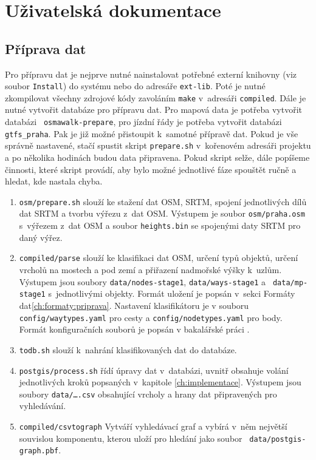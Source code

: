\chapter{Uživatelská dokumentace}
\section{Příprava dat}
Pro přípravu dat je nejprve nutné nainstalovat potřebné externí knihovny (viz
soubor {\tt Install}) do
systému nebo do adresáře {\tt ext-lib}. Poté je nutné zkompilovat všechny zdrojové
kódy zavoláním {\tt make} v~adresáři {\tt compiled}. Dále je nutné vytvořit databáze
pro přípravu dat. Pro mapová data je potřeba vytvořit databázi {\tt
osmawalk-prepare},
pro jízdní řády je potřeba vytvořit databázi {\tt gtfs\_praha}. Pak je již možné
přistoupit k~samotné přípravě dat. Pokud je vše správně nastavené, stačí spustit
skript {\tt prepare.sh} v~kořenovém adresáři projektu a po několika hodinách
budou data připravena. Pokud skript selže, dále popíšeme činnosti, které skript
provádí, aby bylo možné jednotlivé fáze spouštět ručně a hledat, kde nastala chyba.

\begin{enumerate}
\item {\tt osm/prepare.sh} slouží ke stažení dat OSM, SRTM, spojení jednotlivých
dílů dat SRTM a tvorbu výřezu z~dat OSM. Výstupem je soubor {\tt osm/praha.osm}
s~výřezem z~dat OSM a soubor {\tt heights.bin} se spojenými daty SRTM pro daný
výřez. 
\item {\tt compiled/parse} slouží ke klasifikaci dat OSM, určení typů objektů,
určení vrcholů na mostech a pod zemí a přiřazení nadmořské výšky k~uzlům.
Výstupem jsou soubory {\tt data/nodes-stage1}, {\tt data/ways-stage1} a {\tt
data/mp-stage1} s~jednotlivými objekty. Formát uložení je popsán v~sekci Formáty
dat\ref{ch:formaty:priprava}. Nastavení klasifikátoru je v souboru {\tt
config/waytypes.yaml} pro cesty a {\tt config/nodetypes.yaml} pro body. Formát
konfiguračních souborů je popsán v bakalářské práci \cite{bakalarka}.
\item {\tt todb.sh} slouží k~nahrání klasifikovaných dat do databáze. 
\item {\tt postgis/process.sh} řídí úpravy dat v~databázi, uvnitř obsahuje
volání jednotlivých kroků popsaných v~kapitole \ref{ch:implementace}.
Výstupem jsou soubory {\tt data/\dots.csv} obsahující vrcholy a hrany dat
připravených pro vyhledávání. 
\item {\tt compiled/csvtograph} Vytváří vyhledávací graf a vybírá v~něm největší
souvislou komponentu, kterou uloží pro hledání jako soubor {\tt
data/postgis-graph.pbf}.
\end{enumerate}

